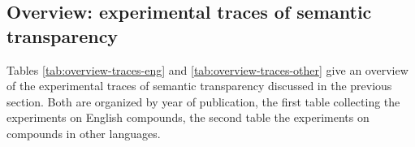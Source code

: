 \subsection{Overview: experimental traces of semantic transparency}
\label{sec:psych-overview}
Tables \ref{tab:overview-traces-eng} and \ref{tab:overview-traces-other} give an overview of the experimental
traces of semantic transparency discussed in the previous section. Both are organized by year of publication, the first table collecting the experiments on English compounds, the second table the experiments on compounds in other languages.


